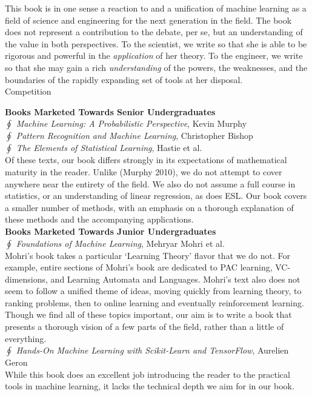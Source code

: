 \documentclass[10pt]{article}
\newenvironment{changemargin}[2]{%
\begin{list}{}{%
\setlength{\topsep}{0pt}%
\setlength{\leftmargin}{#1}%
\setlength{\rightmargin}{#2}%
\setlength{\listparindent}{\parindent}%
\setlength{\itemindent}{\parindent}%
\setlength{\parsep}{\parskip}%
}%
\item[]}{\end{list}}
\renewcommand{\it}{\textit}
\begin{document}
\begin{changemargin}{+-1cm}{-3cm}
This book is in one sense a reaction to and a unification of machine learning as a field of science and engineering for the next generation in the field. The book does not represent a contribution to the debate, per se, but an understanding of the value in both perspectives. To the scientist, we write so that she is able to be rigorous and powerful in the \it{application} of her theory. To the engineer, we write so that she may gain a rich \it{understanding} of the powers, the weaknesses, and the boundaries of the rapidly expanding set of tools at her disposal. \\

\newpage
\noindent
\large{Competition}\\
\small

\textbf{Books Marketed Towards Senior Undergraduates} \\

$\oint$ \it{Machine Learning: A Probabilistic Perspective}, Kevin Murphy \\
$\oint$ \it{Pattern Recognition and Machine Learning}, Christopher Bishop \\
$\oint$ \it{The Elements of Statistical Learning}, Hastie et al. \\

Of these texts, our book differs strongly in its expectations of mathematical maturity in the reader. Unlike (Murphy 2010), we do not attempt to cover anywhere near the entirety of the field. We also do not assume a full course in statistics, or an understanding of linear regression, as does ESL. Our book covers a smaller number of methods, with an emphasis on a thorough explanation of these methods and the accompanying applications. \\

\textbf{Books Marketed Towards Junior Undergraduates} \\

$\oint$ \it{Foundations of Machine Learning}, Mehryar Mohri et al. \\

Mohri's book takes a particular `Learning Theory' flavor that we do not. For example, entire sections of Mohri's book are dedicated to PAC learning, VC-dimensions, and Learning Automata and Languages. Mohri's text also does not seem to follow a unified theme of ideas, moving quickly from learning theory, to ranking problems, then to online learning and eventually reinforcement learning. Though we find all of these topics important, our aim is to write a book that presents a thorough vision of a few parts of the field, rather than a little of everything.\\

$\oint$ \it{Hands-On Machine Learning with Scikit-Learn and TensorFlow}, Aurelien Geron \\

While this book does an excellent job introducing the reader to the practical tools in machine learning, it lacks the technical depth we aim for in our book.\\

\end{changemargin}
\end{document}
